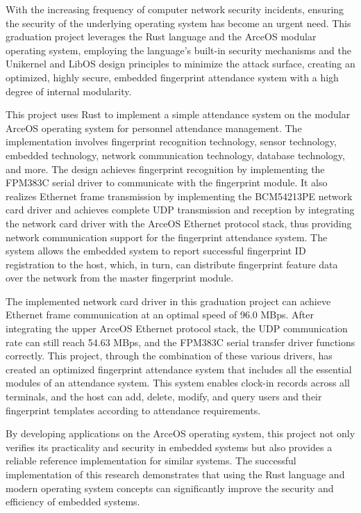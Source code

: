 \documentclass[UTF8,AutoFakeBold=1,AutoFakeSlant,zihao=-4]{scnuthesis}
\begin{document}
\begin{abstractEN}

    With the increasing frequency of computer network security incidents, ensuring the security of the underlying operating system has become an urgent need. This graduation project leverages the Rust language and the ArceOS modular operating system, employing the language's built-in security mechanisms and the Unikernel and LibOS design principles to minimize the attack surface, creating an optimized, highly secure, embedded fingerprint attendance system with a high degree of internal modularity.

    This project uses Rust to implement a simple attendance system on the modular ArceOS operating system for personnel attendance management. The implementation involves fingerprint recognition technology, sensor technology, embedded technology, network communication technology, database technology, and more. The design achieves fingerprint recognition by implementing the FPM383C serial driver to communicate with the fingerprint module. It also realizes Ethernet frame transmission by implementing the BCM54213PE network card driver and achieves complete UDP transmission and reception by integrating the network card driver with the ArceOS Ethernet protocol stack, thus providing network communication support for the fingerprint attendance system. The system allows the embedded system to report successful fingerprint ID registration to the host, which, in turn, can distribute fingerprint feature data over the network from the master fingerprint module.

    The implemented network card driver in this graduation project can achieve Ethernet frame communication at an optimal speed of 96.0 MBps. After integrating the upper ArceOS Ethernet protocol stack, the UDP communication rate can still reach 54.63 MBps, and the FPM383C serial transfer driver functions correctly. This project, through the combination of these various drivers, has created an optimized fingerprint attendance system that includes all the essential modules of an attendance system. This system enables clock-in records across all terminals, and the host can add, delete, modify, and query users and their fingerprint templates according to attendance requirements.

    By developing applications on the ArceOS operating system, this project not only verifies its practicality and security in embedded systems but also provides a reliable reference implementation for similar systems. The successful implementation of this research demonstrates that using the Rust language and modern operating system concepts can significantly improve the security and efficiency of embedded systems.
\end{abstractEN}
\end{document}
